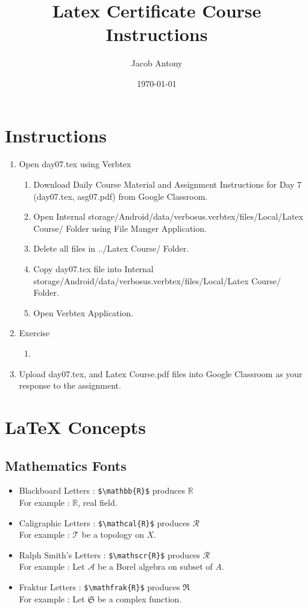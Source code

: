 \documentclass{article}
\title{Latex Certificate Course Instructions}
\author{Jacob Antony}
\date{\today}
\begin{document}
\maketitle

\section*{Instructions}
\begin{enumerate}
	\item Open day07.tex using Verbtex
	\begin{enumerate}
		\item Download Daily Course Material and Assignment Instructions for Day 7 (day07.tex, asg07.pdf) from Google Classroom.
		\item Open Internal storage/Android/data/verbosus.verbtex/files/Local/Latex Course/ Folder using File Manger Application.
		\item Delete all files in ../Latex Course/ Folder.
		\item Copy day07.tex file into Internal storage/Android/data/verbosus.verbtex/files/Local/Latex Course/  Folder.
		\item Open Verbtex Application.
	\end{enumerate}
	\item Exercise
	\begin{enumerate}
		\item 
	\end{enumerate}
	\item Upload day07.tex, and Latex Course.pdf files into Google Classroom as your response to the assignment.
\end{enumerate}

\section{\LaTeX{} Concepts}

\subsection{Mathematics Fonts}
\begin{itemize}
	\item Blackboard Letters : \texttt{\$\textbackslash{}mathbb\{R\}\$} produces $\mathbb{R}$ \\ For example : $\mathbb{R}$, real field.
	\item Caligraphic Letters : \texttt{\$\textbackslash{}mathcal\{R\}\$} produces $\mathcal{R}$ \\ For example : $\mathcal{T}$ be a topology on $X$.
	\item Ralph Smith's Letters : \texttt{\$\textbackslash{}mathscr\{R\}\$} produces $\mathscr{R}$ \\ For example : Let $\mathscr{A}$ be a Borel algebra on subset of $A$.
	\item Fraktur Letters : \texttt{\$\textbackslash{}mathfrak\{R\}\$} produces $\mathfrak{R}$ \\ For example : Let $\mathfrak{S}$ be a complex function.
\end{itemize}
\end{document}

